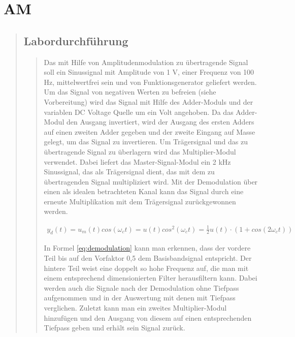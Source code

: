 

\section{AM}
\begin{quote}
    
    
    \subsection{Labordurchführung}
    \begin{quote}
      Das mit Hilfe von Amplitudenmodulation zu übertragende Signal soll ein
      Sinussignal mit Amplitude von 1 V, einer Frequenz von 100 Hz, mittelwertfrei sein und von Funktionsgenerator geliefert 
      werden. Um das Signal von negativen Werten zu befreien (siehe
      Vorbereitung) wird das Signal mit Hilfe des Adder-Moduls und der variablen DC Voltage Quelle
      um ein Volt angehoben. Da das Adder-Modul den Ausgang invertiert, wird der
      Ausgang des ersten Adders auf einen zweiten Adder gegeben und der zweite
      Eingang auf Masse gelegt, um das Signal zu invertieren.
      Um Trägersignal und das zu übertragende Signal zu überlagern wird das
      Multiplier-Modul verwendet. Dabei liefert das Master-Signal-Modul ein 2
      kHz Sinussignal, das als Trägersignal dient, das mit dem zu übertragenden
      Signal multipliziert wird.
        Mit der Demodulation über einen als idealen betrachteten Kanal kann das
        Signal durch eine erneute Multiplikation mit dem Trägersignal
        zurückgewonnen werden.
        
      \begin{equation*}
        \begin{split}
         y_{d}(t)=u_{m}(t)cos(\omega_{c}t)=u(t)cos^{2}(\omega_{c}t)=\frac{1}{2}u(t)\cdot
         (1+cos(2\omega_{c}t))
         \label{eq:demodulation}
        \end{split}
        \end{equation*}
        
        In Formel \ref{eq:demodulation} kann man erkennen, dass der vordere Teil
        bis auf den Vorfaktor 0,5 dem Basisbandsignal entspricht. Der hintere
        Teil weist eine doppelt so hohe Frequenz auf, die man mit einem
        entsprechend dimensionierten Filter herausfiltern kann.
        Dabei werden auch die Signale nach der Demodulation ohne Tiefpass
        aufgenommen und in der Auswertung mit denen mit Tiefpass verglichen.
        Zuletzt kann man ein zweites Multiplier-Modul hinzufügen und den Ausgang
        von diesem auf einen entsprechenden Tiefpass geben und erhält sein
        Signal zurück.
        

\end{quote}
\end{quote}
